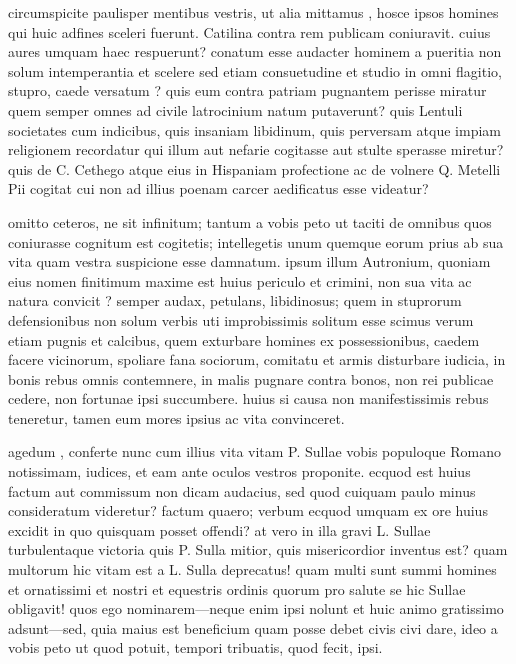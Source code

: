  circumspicite paulisper mentibus vestris, ut alia mittamus , hosce ipsos homines qui huic adfines sceleri fuerunt. Catilina contra rem publicam coniuravit. cuius aures umquam haec respuerunt? conatum esse audacter hominem a pueritia non solum intemperantia et scelere sed etiam consuetudine et studio in omni flagitio, stupro, caede versatum ? quis eum contra patriam pugnantem perisse miratur quem semper omnes ad civile latrocinium natum putaverunt? quis Lentuli societates cum indicibus, quis insaniam libidinum, quis perversam atque impiam religionem recordatur qui illum aut nefarie cogitasse aut stulte sperasse miretur? quis de C. Cethego atque eius in Hispaniam profectione ac de volnere Q. Metelli Pii cogitat cui non ad illius poenam carcer aedificatus esse videatur?

 omitto ceteros, ne sit infinitum; tantum a vobis peto ut taciti de omnibus quos coniurasse cognitum est cogitetis; intellegetis unum quemque eorum prius ab sua vita quam vestra suspicione esse damnatum. ipsum illum Autronium, quoniam eius nomen finitimum maxime est huius periculo et crimini, non sua vita ac natura convicit ? semper audax, petulans, libidinosus; quem in stuprorum defensionibus non solum verbis uti improbissimis solitum esse scimus verum etiam pugnis et calcibus, quem exturbare homines ex possessionibus, caedem facere vicinorum, spoliare fana sociorum, comitatu et armis disturbare iudicia, in bonis rebus omnis contemnere, in malis pugnare contra bonos, non rei publicae cedere, non fortunae ipsi succumbere. huius si causa non manifestissimis rebus teneretur, tamen eum mores ipsius ac vita convinceret.

 agedum , conferte nunc cum illius vita vitam P. Sullae vobis populoque Romano notissimam, iudices, et eam ante oculos vestros proponite. ecquod est huius factum aut commissum non dicam audacius, sed quod cuiquam paulo minus consideratum videretur? factum quaero; verbum ecquod umquam ex ore huius excidit in quo quisquam posset offendi? at vero in illa gravi L. Sullae turbulentaque victoria quis P. Sulla mitior, quis misericordior inventus est? quam multorum hic vitam est a L. Sulla deprecatus! quam multi sunt summi homines et ornatissimi et nostri et equestris ordinis quorum pro salute se hic Sullae obligavit! quos ego nominarem—neque enim ipsi nolunt et huic animo gratissimo adsunt—sed, quia maius est beneficium quam posse debet civis civi dare, ideo a vobis peto ut quod potuit, tempori tribuatis, quod fecit, ipsi.

